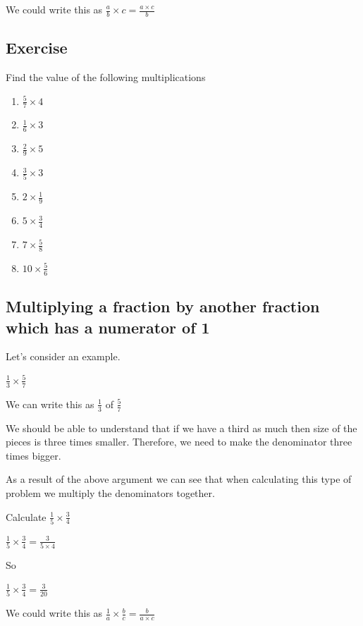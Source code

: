 We could write this as $\displaystyle\frac{a}{b} \times c = \frac{a \times c}{b}$

\subsection{Exercise}
Find the value of the following multiplications
\begin{enumerate}
	\item $\frac{5}{7} \times 4$
	\item $\frac{1}{6} \times 3$
	\item $\frac{2}{9} \times 5$
	\item $\frac{3}{5} \times 3$
	\item $2 \times \frac{1}{9}$
	\item $5 \times \frac{3}{4}$
	\item $7 \times \frac{5}{8}$
	\item $10 \times \frac{5}{6}$
\end{enumerate}

\subsection{Multiplying a fraction by another fraction which has a numerator of 1}
Let's consider an example.

$\displaystyle \frac{1}{3} \times \frac{5}{7}$

\noindent We can write this as $\displaystyle \frac{1}{3}$ of $\displaystyle \frac{5}{7}$

We should be able to understand that if we have a third as much then size of the pieces is three times smaller.  Therefore, we need to make the denominator three times bigger.

As a result of the above argument we can see that when calculating this type of problem we multiply the denominators together.

\begin{exmp}
Calculate $\displaystyle \frac{1}{5} \times \frac{3}{4}$

$\displaystyle \frac{1}{5} \times \frac{3}{4} = \frac{3}{5 \times 4}$

So

$\displaystyle \frac{1}{5} \times \frac{3}{4} = \frac{3}{20}$
\end{exmp}

We could write this as $\displaystyle\frac{1}{a} \times \frac{b}{c} = \frac{b}{a \times c}$

